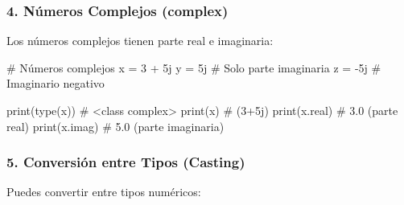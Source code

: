 \documentclass[
  doc,
  floatsintext,
  longtable,
  a4paper,
  nolmodern,
  notxfonts,
  notimes,
  12pt,
  colorlinks=true,linkcolor=blue,citecolor=blue,urlcolor=blue]{apa7}
\newenvironment{Shaded}{\begin{snugshade}}{\end{snugshade}}
\newcommand{\BuiltInTok}[1]{\textcolor[rgb]{0.00,0.23,0.31}{#1}}
\newcommand{\CommentTok}[1]{\textcolor[rgb]{0.37,0.37,0.37}{#1}}
\newcommand{\DecValTok}[1]{\textcolor[rgb]{0.68,0.00,0.00}{#1}}
\newcommand{\NormalTok}[1]{\textcolor[rgb]{0.00,0.23,0.31}{#1}}
\newcommand{\OperatorTok}[1]{\textcolor[rgb]{0.37,0.37,0.37}{#1}}
\newcommand{\OtherTok}[1]{\textcolor[rgb]{0.00,0.23,0.31}{#1}}
\begin{document}
\subsubsection{4. Números Complejos
(complex)}\label{nuxfameros-complejos-complex}

Los números complejos tienen parte real e imaginaria:

\begin{Shaded}
\begin{Highlighting}[]
\CommentTok{\# Números complejos}
\NormalTok{x }\OperatorTok{=} \DecValTok{3} \OperatorTok{+} \OtherTok{5j}
\NormalTok{y }\OperatorTok{=} \OtherTok{5j}          \CommentTok{\# Solo parte imaginaria}
\NormalTok{z }\OperatorTok{=} \OperatorTok{{-}}\OtherTok{5j}         \CommentTok{\# Imaginario negativo}

\BuiltInTok{print}\NormalTok{(}\BuiltInTok{type}\NormalTok{(x))  }\CommentTok{\# \textless{}class \textquotesingle{}complex\textquotesingle{}\textgreater{}}
\BuiltInTok{print}\NormalTok{(x)        }\CommentTok{\# (3+5j)}
\BuiltInTok{print}\NormalTok{(x.real)   }\CommentTok{\# 3.0 (parte real)}
\BuiltInTok{print}\NormalTok{(x.imag)   }\CommentTok{\# 5.0 (parte imaginaria)}
\end{Highlighting}
\end{Shaded}

\subsubsection{5. Conversión entre Tipos
(Casting)}\label{conversiuxf3n-entre-tipos-casting}

Puedes convertir entre tipos numéricos:
\end{document}
